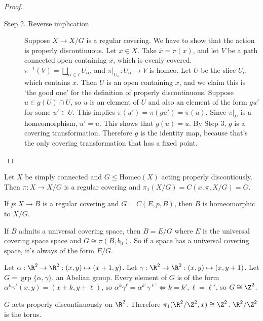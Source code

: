 \begin{proof}
\begin{description}
        \item[Step 2. Reverse implication]
            Suppose $X \to  X / G$ is a regular covering.
            We have to show that the action is properly discontinuous.
            Let $x \in X$.
            Take $\overline{x} = \pi(x)$, and let $V$ be a path connected open containing $\overline{x}$, which is evenly covered.
            $\pi^{-1}(V) = \bigsqcup_{\alpha \in I} U_\alpha$, and $\pi|_{U_\alpha}: U_\alpha \to  V$ is homeo.
            Let $U$ be the slice $U_\alpha$ which contains $x$.
            Then $U$ is an open containing $x$, and we claim this is `the good one' for the definition of properly discontinuous.
            Suppose $u \in  g(U) \cap  U$, so $u$ is an element of $U$ and also an element of the form $gu'$ for some  $u' \in U$.
            This implies $\pi(u') = \pi( g u') = \pi(u)$.
            Since  $\pi|_U$ is a homeomorphism,  $u' = u$.
            This shows that $g(u) = u$.
            By Step 3, $g$ is a covering transformation.
            Therefore $g$ is the identity map, because that's the only covering transformation that has a fixed point.
    \end{description}
\end{proof}

\begin{corollary}
    Let $X$ be simply connected and $G \le \text{Homeo}(X)$ acting properly discontiously.
    Then $\pi: X \to  X / G$ is a regular covering and $\pi_1( X / G) = C(x, \pi, X / G) = G$.
\end{corollary}

\begin{remark}
    If $p: X \to  B$ is a regular covering and $G = C(E, p, B)$,
    then $B$ is homeomorphic to $X / G$.

    If $B$ admits a universal covering space, then $B = E / G$ where $E$ is the universal covering space  space and $G \cong \pi(B,b_0)$.
    So if a space has a universal covering space, it's always of the form $E / G$.
\end{remark}

\begin{eg}
    Let $\alpha: \R^2 \to  \R^2: (x, y) \mapsto (x+1, y)$.
    Let $\gamma: \R^2\to \R^2: (x, y) \mapsto  (x, y+1)$.
    Let $G = \operatorname{grp} \{\alpha, \gamma\}$, an Abelian group.
    Every element of $G$ is of the form $\alpha ^{k} \gamma ^{\ell}(x, y) = (x+k, y+\ell)$,
    so $\alpha ^{k} \gamma^{\ell} = \alpha ^{k'} \gamma^{\ell'} \iff k = k', \ell = \ell'$, so $G \cong \Z^2$.

    $G$ acts properly discontinuously on $\R^2$.
    Therefore $\pi_1(\R^2 / \Z^2, x) \cong \Z^2$.
    $\R^2 / \Z^2$ is the torus.
\end{eg}

